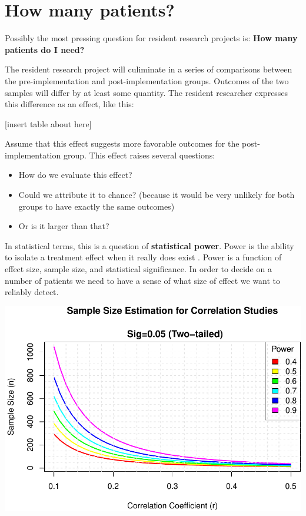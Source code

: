 \documentclass[
]{report}
\providecommand{\tightlist}{%
  \setlength{\itemsep}{0pt}\setlength{\parskip}{0pt}}
\begin{document}
\hypertarget{how-many-patients}{%
\section{How many patients?}\label{how-many-patients}}

Possibly the most pressing question for resident research projects is:
\textbf{How many patients do I need?}

The resident research project will culiminate in a series of comparisons
between the pre-implementation and post-implementation groups. Outcomes
of the two samples will differ by at least some quantity. The resident
researcher expresses this difference as an effect, like this:

{[}insert table about here{]}

Assume that this effect suggests more favorable outcomes for the
post-implementation group. This effect raises several questions:

\begin{itemize}
\tightlist
\item
  How do we evaluate this effect?
\item
  Could we attribute it to chance? (because it would be very unlikely
  for both groups to have exactly the same outcomes)
\item
  Or is it larger than that?
\end{itemize}

In statistical terms, this is a question of \textbf{statistical power}.
Power is the ability to isolate a treatment effect when it really does
exist \citep{Cohen1988}. Power is a function of effect size, sample
size, and statistical significance. In order to decide on a number of
patients we need to have a sense of what size of effect we want to
reliably detect.

\includegraphics{index_files/figure-latex/power-1.pdf}
\end{document}
